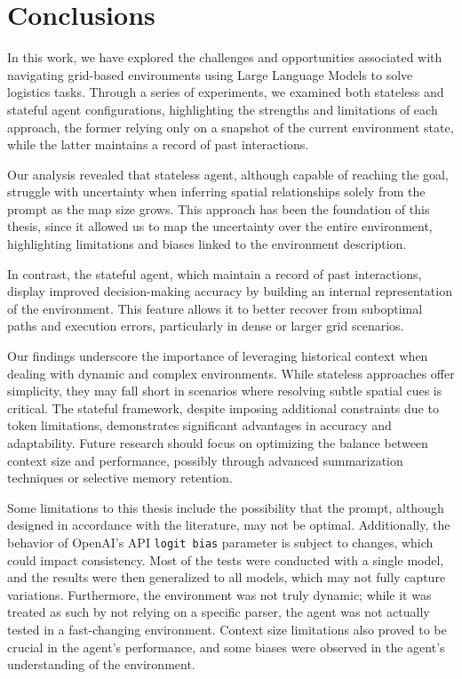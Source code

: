 \chapter{Conclusions}
\label{cha:conclusions}

In this work, we have explored the challenges and opportunities associated with navigating
grid-based environments using Large Language Models to solve logistics tasks.
Through a series of experiments, we examined both stateless and stateful agent configurations,
highlighting the strengths and limitations of each approach, the former relying only
on a snapshot of the current environment state, while the latter maintains a
record of past interactions.

Our analysis revealed that stateless agent, although capable of reaching the goal,
struggle with uncertainty when inferring spatial relationships solely from the
prompt as the map size grows. This approach has been the foundation of this thesis,
since it allowed us to map the uncertainty over the entire environment, highlighting
limitations and biases linked to the environment description.

In contrast, the stateful agent, which maintain a record of past interactions,
display improved decision-making accuracy by building an internal representation
of the environment. This feature allows it to better recover from suboptimal paths
and execution errors, particularly in dense or larger grid scenarios.

Our findings underscore the importance of leveraging historical context when
dealing with dynamic and complex environments. While stateless approaches offer simplicity,
they may fall short in scenarios where resolving subtle spatial cues is critical.
The stateful framework, despite imposing additional constraints due to token
limitations, demonstrates significant advantages in accuracy and adaptability.
Future research should focus on optimizing the balance between context size and
performance, possibly through advanced summarization techniques or selective memory
retention.

\vspace{1mm}
Some limitations to this thesis include the possibility that the prompt,
although designed in accordance with the literature, may not be optimal.
Additionally, the behavior of OpenAI's API \texttt{logit bias} parameter is
subject to changes, which could impact consistency. Most of the tests were
conducted with a single model, and the results were then generalized to all models,
which may not fully capture variations. Furthermore, the environment was not
truly dynamic; while it was treated as such by not relying on a specific parser,
the agent was not actually tested in a fast-changing environment. Context size limitations
also proved to be crucial in the agent's performance, and some biases were
observed in the agent's understanding of the environment.
\vspace{1mm}


